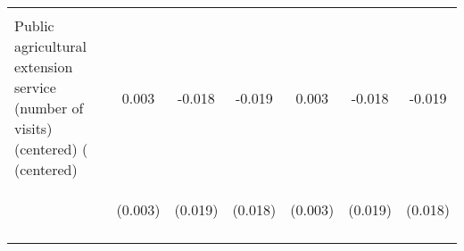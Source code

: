 \begin{center}
\begin{tabular}{lcccccc}
\vspace{4pt} & \begin{footnotesize}[0.000]\end{footnotesize} & \begin{footnotesize}[0.000]\end{footnotesize} & \begin{footnotesize}[0.000]\end{footnotesize} & \begin{footnotesize}[0.000]\end{footnotesize} & \begin{footnotesize}[0.000]\end{footnotesize} & \begin{footnotesize}[0.000]\end{footnotesize} \\
Public agricultural extension service (number of visits) (centered) ( (centered) & 0.003 & -0.018 & -0.019 & 0.003 & -0.018 & -0.019 \\
 & \begin{footnotesize}(0.003)\end{footnotesize} & \begin{footnotesize}(0.019)\end{footnotesize} & \begin{footnotesize}(0.018)\end{footnotesize} & \begin{footnotesize}(0.003)\end{footnotesize} & \begin{footnotesize}(0.019)\end{footnotesize} & \begin{footnotesize}(0.018)\end{footnotesize} \\
\vspace{4pt} & \begin{footnotesize}[0.293]\end{footnotesize} & \begin{footnotesize}[0.352]\end{footnotesize} & \begin{footnotesize}[0.282]\end{footnotesize} & \begin{footnotesize}[0.293]\end{footnotesize} & \begin{footnotesize}[0.352]\end{footnotesize} & \begin{footnotesize}[0.282]\end{footnotesize} \\

\end{tabular}
\end{center}
